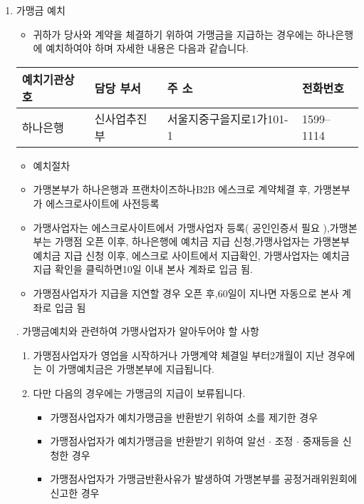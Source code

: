 \documentclass[a5paper,10pt]{oblivoir}
\newcommand\crule[3][black]{\textcolor{#1}{\rule{#2}{#3}}}
\begin{document}
\begin{enumerate}
\newpage
\begin{center}
\crule[red]{4cm}{0.1cm} \crule[blue]{4cm}{0.1cm}
\end{center}
\item 가맹금 예치
\begin{itemize}
\item[] 귀하가 당사와 계약을 체결하기 위하여 가맹금을 지급하는 경우에는  하나은행에 예치하여야 하며 자세한 내용은 다음과 같습니다.
\end{itemize}
\begin{center}
\begin{tiny}
\begin{tabu}{|X[-1]|X[-1]|X[c]|X[-1]|}\hline
예치기관상호& 담당 부서& 주 소&전화번호\\\hline
하나은행&신사업추진부&서울지중구을지로1가101-1&1599--1114\\\hline
\end{tabu}
\end{tiny}
\end{center}
\begin{itemize}
\item[] 예치절차
\item 가맹본부가 하나은행과 프랜차이즈하나B2B 에스크로  계약체결 후, 가맹본부가 에스크로사이트에 사전등록
\item 가맹사업자는  에스크로사이트에서 가맹사업자 등록( 공인인증서 필요 ),가맹본부는  가맹점 오픈 이후, 하나은행에 예치금 지급 신청,가맹사업자는 가맹본부 예치금 지급 신청 이후,  에스크로 사이트에서 지급확인, 가맹사업자는 예치금 지급 확인을 클릭하면10일  이내 본사 계좌로  입금 됨.
\item 가맹점사업자가 지급을 지연할 경우 오픈 후,60일이 지나면 자동으로 본사 계좌로 입금 됨
\end{itemize}.
가맹금예치와 관련하여 가맹사업자가 알아두어야 할 사항 
\begin{enumerate}
\item[1.] 가맹점사업자가 영업을 시작하거나 가맹계약 체결일 부터2개월이 지난 경우에는 이 가맹예치금은 가맹본부에 지급됩니다.
\item[2.] 다만 다음의 경우에는  가맹금의 지급이 보류됩니다.
\begin{itemize}
\item[가.] 가맹점사업자가 예치가맹금을 반환받기 위하여 소를 제기한 경우
\item[나.] 가맹점사업자가 예치가맹금을 반환받기 위하여  알선 $\cdot$ 조정 $\cdot$ 중재등을 신청한 경우
\item[다.] 가맹점사업자가  가맹금반환사유가 발생하여 가맹본부를 공정거래위원회에 신고한 경우

\end{itemize}
\end{enumerate}
\end{enumerate}
\end{document}

